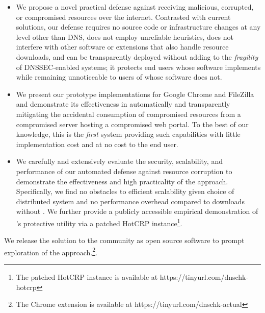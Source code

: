 \begin{itemize}

  \item We propose a novel practical defense against receiving malicious,
  corrupted, or compromised resources over the internet. Contrasted with current
  solutions, our defense requires no source code or infrastructure changes at
  any level other than DNS, does not employ unreliable heuristics, does not
  interfere with other software or extensions that also handle resource
  downloads, and can be transparently deployed without adding to the
  \textit{fragility} of DNSSEC-enabled systems; it protects end users whose
  software implements \SYSTEM{} while remaining unnoticeable to users of whose
  software does not.

  \item We present our prototype \SYSTEM{} implementations for Google Chrome and
  FileZilla and demonstrate its effectiveness in automatically and transparently
  mitigating the accidental consumption of compromised resources from a
  compromised server hosting a compromised web portal. To the best of our
  knowledge, this is the \emph{first} system providing such capabilities with
  little implementation cost and at no cost to the end user.

  \item We carefully and extensively evaluate the security, scalability, and
  performance of our automated defense against resource corruption to
  demonstrate the effectiveness and high practicality of the \SYSTEM{} approach.
  Specifically, we find no obstacles to efficient scalability given choice of
  distributed system and no performance overhead compared to downloads without
  \SYSTEM{}. We further provide a publicly accessible empirical demonstration of
  \SYSTEM{}'s protective utility via a patched HotCRP instance\footnote{The
  patched HotCRP instance is available at https://tinyurl.com/dnschk-hotcrp}.

\end{itemize}

We release the \SYSTEM{} solution to the community as open source software to
prompt exploration of the \SYSTEM{} approach.\footnote{The Chrome extension is
available at https://tinyurl.com/dnschk-actual}.
